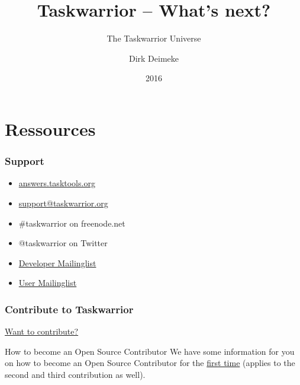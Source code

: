 \documentclass[t,handout]{beamer}
\title{Taskwarrior -- What's next?}
\subtitle{The Taskwarrior Universe}
\author[Deimeke, Dirk]{Dirk Deimeke}
\institute[Taskwarrior Academy]{Taskwarrior Academy}
\date{2016}
\begin{document}
\begin{frame} %
	\titlepage
\end{frame}



\section{Ressources}

\begin{frame}\frametitle{Support}
    \vfill
    \begin{itemize}
        \item \href{https://answers.tasktools.org/}{answers.tasktools.org}
        \item \href{mailto:support@taskwarrior.org}{support@taskwarrior.org}
        \item \#taskwarrior on freenode.net
        \item @taskwarrior on Twitter
        \item \href{https://groups.google.com/forum/\#!forum/taskwarrior-dev}{Developer Mailinglist}
        \item \href{https://groups.google.com/forum/\#!forum/taskwarrior-user}{User Mailinglist}
    \end{itemize}
\end{frame}

\begin{frame}\frametitle{Contribute to Taskwarrior}
    \vfill
    \href{http://taskwarrior.org/docs/contribute.html}{Want to contribute?}
    \vfill
	\begin{alertblock}{How to become an Open Source Contributor}
		We have some information for you on how to become an Open Source Contributor for the \href{http://taskwarrior.org/docs/first_time.html}{first time} (applies to the second and third contribution as well).
	\end{alertblock}
\end{frame}
\end{document}
